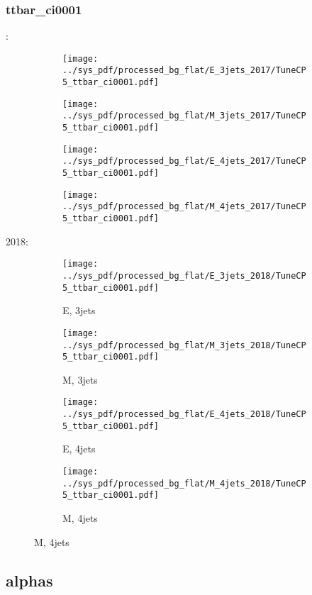 \documentclass{beamer}
\begin{document}
\begin{frame}
\frametitle{ttbar_ci0001}
\fontsize{5}{1}:
\begin{figure}
\centering
\begin{subfigure}[b]{0.24\textwidth}
\texttt{[image: ../sys\_pdf/processed\_bg\_flat/E\_3jets\_2017/TuneCP5\_ttbar\_ci0001.pdf]}
\end{subfigure}
\begin{subfigure}[b]{0.24\textwidth}
\texttt{[image: ../sys\_pdf/processed\_bg\_flat/M\_3jets\_2017/TuneCP5\_ttbar\_ci0001.pdf]}
\end{subfigure}
\begin{subfigure}[b]{0.24\textwidth}
\texttt{[image: ../sys\_pdf/processed\_bg\_flat/E\_4jets\_2017/TuneCP5\_ttbar\_ci0001.pdf]}
\end{subfigure}
\begin{subfigure}[b]{0.24\textwidth}
\texttt{[image: ../sys\_pdf/processed\_bg\_flat/M\_4jets\_2017/TuneCP5\_ttbar\_ci0001.pdf]}
\end{subfigure}
\end{figure}
2018:
\begin{figure}
\centering
\begin{subfigure}[b]{0.24\textwidth}
\texttt{[image: ../sys\_pdf/processed\_bg\_flat/E\_3jets\_2018/TuneCP5\_ttbar\_ci0001.pdf]}
\captionsetup{font=tiny}
\caption{E, 3jets}
\end{subfigure}
\begin{subfigure}[b]{0.24\textwidth}
\texttt{[image: ../sys\_pdf/processed\_bg\_flat/M\_3jets\_2018/TuneCP5\_ttbar\_ci0001.pdf]}
\captionsetup{font=tiny}
\caption{M, 3jets}
\end{subfigure}
\begin{subfigure}[b]{0.24\textwidth}
\texttt{[image: ../sys\_pdf/processed\_bg\_flat/E\_4jets\_2018/TuneCP5\_ttbar\_ci0001.pdf]}
\captionsetup{font=tiny}
\caption{E, 4jets}
\end{subfigure}
\begin{subfigure}[b]{0.24\textwidth}
\texttt{[image: ../sys\_pdf/processed\_bg\_flat/M\_4jets\_2018/TuneCP5\_ttbar\_ci0001.pdf]}
\captionsetup{font=tiny}
\caption{M, 4jets}
\end{subfigure}
\end{figure}
\end{frame}


\subsection{alphas}
\end{document}
